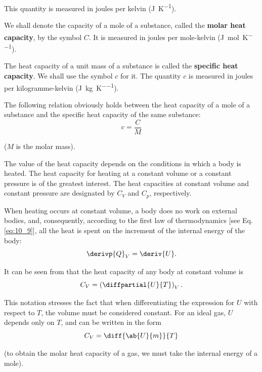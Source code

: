 \noindent
This quantity is measured in joules per kelvin (\si{\joule\per\kelvin}).

We shall denote the capacity of a mole of a substance, called the \textbf{molar heat capacity}, by the symbol $C$. It is measured in joules per mole-kelvin (\si{\joule\per\mole\per\kelvin}).

The heat capacity of a unit mass of a substance is called the \textbf{specific heat capacity}. We shall use the symbol $c$ for it. The quantity $c$ is measured in joules per kilogramme-kelvin (\si{\joule\per\kilo\gram\per\kelvin}).

The following relation obviously holds between the heat capacity of a mole of a substance and the specific heat capacity of the same substance:
\begin{equation}\label{eq:10_25}
	c = \frac{C}{M}
\end{equation}

\noindent
($M$ is the molar mass).

The value of the heat capacity depends on the conditions in which a body is heated. The heat capacity for heating at a constant volume or a constant pressure is of the greatest interest. The heat capacities at constant volume and constant pressure are designated by $C_V$ and $C_p$, respectively.

When heating occurs at constant volume, a body does no work on external bodies, and, consequently, according to the first law of thermodynamics [see Eq. \eqref{eq:10_9}], all the heat is spent on the increment of the internal energy of the body:
\begin{equation}\label{eq:10_26}
	\derivp{Q}_V = \deriv{U}.
\end{equation}

\noindent
It can be seen from  that the heat capacity of any body at constant volume is
\begin{equation}\label{eq:10_27}
	C_V = \left(\diffpartial{U}{T}\right)_V.
\end{equation}

\noindent
This notation stresses the fact that when differentiating the expression for $U$ with respect to $T$, the volume must be considered constant. For an ideal gas, $U$ depends only on $T$, and  can be written in the form
\begin{equation*}
	C_V = \diff{\ab{U}{m}}{T}
\end{equation*}

\noindent
(to obtain the molar heat capacity of a gas, we must take the internal energy of a mole).

